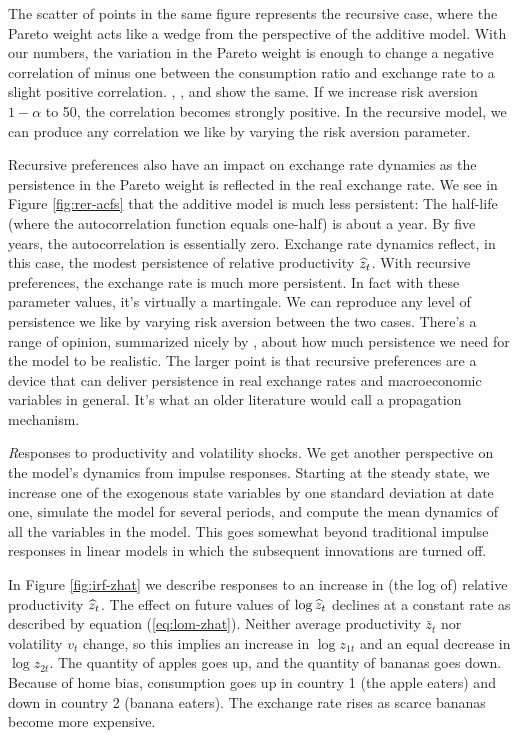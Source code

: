 The scatter of points in the same figure represents the recursive case,
where the Pareto weight acts like a wedge from the perspective of the additive model.
With our numbers, the variation in the Pareto weight is enough to change
a negative correlation of minus one between the consumption ratio and exchange rate
to a slight positive correlation.
\citet{Colacito2013-yq}, \citet{Kollmann2015-sy}, and \citet{Tretvoll2011-lo} show the same.
If we increase risk aversion $1-\alpha$ to 50,
the correlation becomes strongly positive.
In the recursive model,
we can produce any correlation we like by varying the risk aversion
parameter.


Recursive preferences also have an impact on exchange rate dynamics
as the persistence in the Pareto weight is reflected in the real exchange rate.
We see in Figure \ref{fig:rer-acfs} that the additive model is much less persistent:
The half-life (where the autocorrelation function equals one-half) is about a year.
By five years, the autocorrelation is essentially zero.
Exchange rate dynamics reflect, in this case, the modest persistence of relative productivity $\widehat{z}_t$.
With recursive preferences, the exchange rate is much more persistent.
In fact with these parameter values, it's virtually a martingale.
We can reproduce any level of persistence we like by varying risk aversion
between the two cases.
There's a range of opinion, summarized nicely by \citet{Crucini2008-mi},
about how much persistence we need for the model to be realistic.
The larger point is that recursive preferences are a device that can deliver
persistence in real exchange rates and macroeconomic variables in general.
It's what an older literature would call a propagation mechanism.


{\textit Responses to productivity and volatility shocks.\/}
We get another perspective on the model's dynamics from impulse responses.
Starting at the steady state, we increase one of the exogenous state variables
by one standard deviation at date one, simulate the model for several periods,
and compute the mean dynamics of all the variables in the model.
This goes somewhat beyond traditional impulse responses in linear models in
which the subsequent innovations are turned off.

In Figure \ref{fig:irf-zhat}
we describe responses to an increase in (the log of) relative productivity $\widehat{z}_t$.
The effect on future values of $\log \widehat{z}_t$ declines at a constant rate
as described by equation (\ref{eq:lom-zhat}).
Neither average productivity $\bar{z}_t$ nor volatility $v_t$ change,
so this implies an increase in $\log z_{1t}$ and an equal decrease in $\log z_{2t}$.
The quantity of apples goes up, and the quantity of bananas goes down.
Because of home bias, consumption goes up in country 1 (the apple eaters)
and down in country 2 (banana eaters).
The exchange rate rises as scarce bananas become more expensive.

